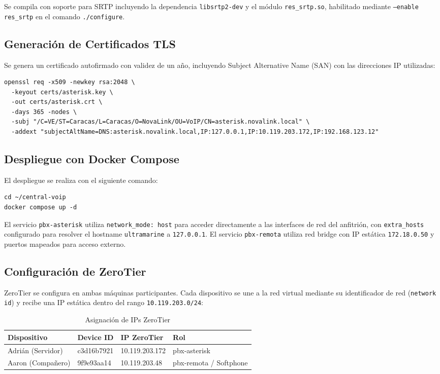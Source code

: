 \documentclass[12pt,a4paper]{article}
\begin{document}
Se compila con soporte para SRTP incluyendo la dependencia \texttt{libsrtp2-dev} y el módulo \texttt{res\_srtp.so}, habilitado mediante \texttt{--enable res\_srtp} en el comando \texttt{./configure}.

\subsection{Generación de Certificados TLS}

Se genera un certificado autofirmado con validez de un año, incluyendo Subject Alternative Name (SAN) con las direcciones IP utilizadas:

\begin{lstlisting}
openssl req -x509 -newkey rsa:2048 \
  -keyout certs/asterisk.key \
  -out certs/asterisk.crt \
  -days 365 -nodes \
  -subj "/C=VE/ST=Caracas/L=Caracas/O=NovaLink/OU=VoIP/CN=asterisk.novalink.local" \
  -addext "subjectAltName=DNS:asterisk.novalink.local,IP:127.0.0.1,IP:10.119.203.172,IP:192.168.123.12"
\end{lstlisting}

\subsection{Despliegue con Docker Compose}

El despliegue se realiza con el siguiente comando:

\begin{lstlisting}
cd ~/central-voip
docker compose up -d
\end{lstlisting}

El servicio \texttt{pbx-asterisk} utiliza \texttt{network\_mode: host} para acceder directamente a las interfaces de red del anfitrión, con \texttt{extra\_hosts} configurado para resolver el hostname \texttt{ultramarine} a \texttt{127.0.0.1}. El servicio \texttt{pbx-remota} utiliza red bridge con IP estática \texttt{172.18.0.50} y puertos mapeados para acceso externo.

\subsection{Configuración de ZeroTier}

ZeroTier se configura en ambas máquinas participantes. Cada dispositivo se une a la red virtual mediante su identificador de red (\texttt{network id}) y recibe una IP estática dentro del rango \texttt{10.119.203.0/24}:

\begin{table}[H]
\centering
\caption{Asignación de IPs ZeroTier}
\label{tab:zerotier}
\begin{tabular}{@{}llll@{}}
\toprule
\textbf{Dispositivo} & \textbf{Device ID} & \textbf{IP ZeroTier} & \textbf{Rol} \\
\midrule
Adrián (Servidor) & c3d16b7921 & 10.119.203.172 & pbx-asterisk \\
Aaron (Compañero) & 9f9e93aa14 & 10.119.203.48 & pbx-remota / Softphone \\
\bottomrule
\end{tabular}
\end{table}
\end{document}

